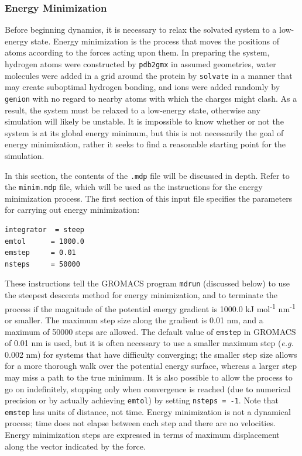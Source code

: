 \documentclass[9pt,tutorial]{livecoms}
\begin{document}
\subsubsection{Energy Minimization} \label{lyso_em}

Before beginning dynamics, it is necessary to relax the solvated system to a low-energy state. Energy minimization is the process that moves the positions of atoms according to the forces acting upon them. In preparing the system, hydrogen atoms were constructed by \texttt{pdb2gmx} in assumed geometries, water molecules were added in a grid around the protein by \texttt{solvate} in a manner that may create suboptimal hydrogen bonding, and ions were added randomly by \texttt{genion} with no regard to nearby atoms with which the charges might clash. As a result, the system must be relaxed to a low-energy state, otherwise any simulation will likely be unstable. It is impossible to know whether or not the system is at its global energy minimum, but this is not necessarily the goal of energy minimization, rather it seeks to find a reasonable starting point for the simulation.

In this section, the contents of the \texttt{.mdp} file will be discussed in depth. Refer to the \texttt{minim.mdp} file, which will be used as the instructions for the energy minimization process. The first section of this input file specifies the parameters for carrying out energy minimization:

\begin{verbatim}
integrator	= steep
emtol      = 1000.0
emstep     = 0.01
nsteps     = 50000
\end{verbatim}

These instructions tell the GROMACS program \texttt{mdrun} (discussed below) to use the steepest descents method for energy minimization, and to terminate the process if the magnitude of the potential energy gradient is 1000.0 kJ mol\textsuperscript{-1} nm\textsuperscript{-1} or smaller. The maximum step size along the gradient is 0.01 nm, and a maximum of 50000 steps are allowed. The default value of \texttt{emstep} in GROMACS of 0.01 nm is used, but it is often necessary to use a smaller maximum step ({\em e.g.} 0.002 nm) for systems that have difficulty converging; the smaller step size allows for a more thorough walk over the potential energy surface, whereas a larger step may miss a path to the true minimum. It is also possible to allow the process to go on indefinitely, stopping only when convergence is reached (due to numerical precision or by actually achieving \texttt{emtol}) by setting \texttt{nsteps = -1}. Note that \texttt{emstep} has units of distance, not time. Energy minimization is not a dynamical process; time does not elapse between each step and there are no velocities. Energy minimization steps are expressed in terms of maximum displacement along the vector indicated by the force.
\end{document}
